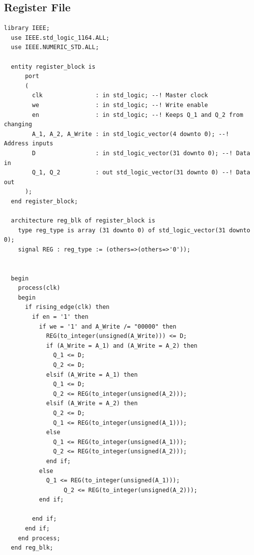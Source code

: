 \documentclass[lettersize,journal]{IEEEtran}
\begin{document}
{\subsection{Register File}
\begin{Verbatim}[breaklines]
  library IEEE;
  use IEEE.std_logic_1164.ALL;
  use IEEE.NUMERIC_STD.ALL;
  
  entity register_block is
      port
      (
        clk               : in std_logic; --! Master clock
        we                : in std_logic; --! Write enable
        en                : in std_logic; --! Keeps Q_1 and Q_2 from changing
        A_1, A_2, A_Write : in std_logic_vector(4 downto 0); --! Address inputs
        D                 : in std_logic_vector(31 downto 0); --! Data in
        Q_1, Q_2          : out std_logic_vector(31 downto 0) --! Data out
      );
  end register_block;
  
  architecture reg_blk of register_block is
    type reg_type is array (31 downto 0) of std_logic_vector(31 downto 0);
    signal REG : reg_type := (others=>(others=>'0'));
  
    
  begin
    process(clk)
    begin
      if rising_edge(clk) then
        if en = '1' then
          if we = '1' and A_Write /= "00000" then
            REG(to_integer(unsigned(A_Write))) <= D;
            if (A_Write = A_1) and (A_Write = A_2) then
              Q_1 <= D;
              Q_2 <= D;
            elsif (A_Write = A_1) then
              Q_1 <= D;
              Q_2 <= REG(to_integer(unsigned(A_2)));
            elsif (A_Write = A_2) then
              Q_2 <= D;
              Q_1 <= REG(to_integer(unsigned(A_1)));
            else
              Q_1 <= REG(to_integer(unsigned(A_1)));
              Q_2 <= REG(to_integer(unsigned(A_2)));
            end if;
          else
            Q_1 <= REG(to_integer(unsigned(A_1)));
                 Q_2 <= REG(to_integer(unsigned(A_2)));
          end if;
                  
        end if;
      end if;
    end process;
  end reg_blk;
\end{Verbatim}
}

\nocite{*}

\end{document}
